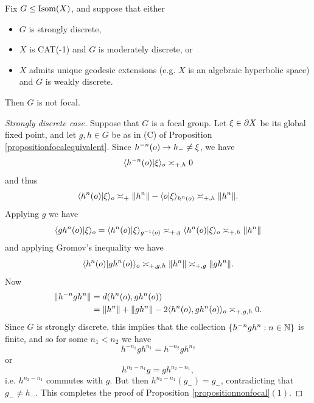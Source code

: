 \begin{proposition}
\label{propositionnonfocal}
Fix $G\leq\operatorname{Isom}(X)$, and suppose that either
\begin{itemize}
\item[(1)] $G$ is strongly discrete,
\item[(2)] $X$ is CAT(-1) and $G$ is moderately discrete, or
\item[(3)] $X$ admits unique geodesic extensions (e.g. $X$ is an algebraic hyperbolic space) and $G$ is weakly discrete.
\end{itemize}
Then $G$ is not focal.
\end{proposition}
\begin{proof}[Strongly discrete case]
Suppose that $G$ is a focal group. Let $\xi\in\partial X$ be its global fixed point, and let $g,h\in G$ be as in (C) of Proposition \ref{propositionfocalequivalent}. Since $h^{-n}(o)\to h_- \neq \xi$, we have
\[
\langle h^{-n}(o)|\xi\rangle_o \asymp_{+,h} 0
\]
and thus
\[
\langle h^n(o)|\xi\rangle_o \asymp_+ \|h^n\| - \langle o|\xi\rangle_{h^n(o)} \asymp_{+,h} \|h^n\|.
\]
Applying $g$ we have
\[
\langle gh^n(o)|\xi\rangle_o
= \langle h^n(o)|\xi\rangle_{g^{-1}(o)}
\asymp_{+,g} \langle h^n(o)|\xi\rangle_o
\asymp_{+,h} \|h^n\|
\]
and applying Gromov's inequality we have
\[
\langle h^n(o) | gh^n(o)\rangle_o \asymp_{+,g,h} \|h^n\| \asymp_{+,g} \|g h^n\|.
\]
Now
\begin{align*}
\|h^{-n} gh^n\|
&= d(h^n(o),gh^n(o))\\
&= \|h^n\| + \|g h^n\| - 2\langle h^n(o),gh^n(o)\rangle_o
\asymp_{+,g,h} 0.
\end{align*}
Since $G$ is strongly discrete, this implies that the collection $\{h^{-n} gh^n:n\in\N\}$ is finite, and so for some $n_1 < n_2$ we have
\[
h^{-n_1} gh^{n_1} = h^{-n_2} gh^{n_2}
\]
or
\[
h^{n_2 - n_1} g = g h^{n_2 - n_1},
\]
i.e. $h^{n_2 - n_1}$ commutes with $g$. But then $h^{n_2 - n_1}(g_-) = g_-$, contradicting that $g_-\neq h_-$. This completes the proof of Proposition \ref{propositionnonfocal}$(1)$.
\end{proof}

